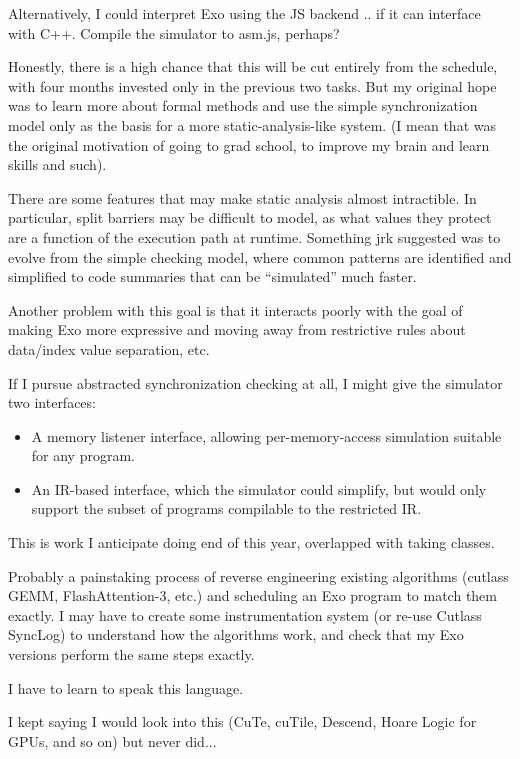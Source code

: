 \filbreak
Alternatively, I could interpret Exo using the JS backend .. if it can interface with C++.
Compile the simulator to asm.js, perhaps?

\filbreak
{}

Honestly, there is a high chance that this will be cut entirely from the schedule, with four months invested only in the previous two tasks.
But my original hope was to learn more about formal methods and use the simple synchronization model only as the basis for a more static-analysis-like system.
(I mean that was the original motivation of going to grad school, to improve my brain and learn skills and such).

\filbreak
There are some features that may make static analysis almost intractible.
In particular, split barriers may be difficult to model, as what values they protect are a function of the execution path at runtime.
Something jrk suggested was to evolve from the simple checking model, where common patterns are identified and simplified to code summaries that can be ``simulated'' much faster.

\filbreak
Another problem with this goal is that it interacts poorly with the goal of making Exo more expressive and moving away from restrictive rules about data/index value separation, etc.

\filbreak
If I pursue abstracted synchronization checking at all, I might give the simulator two interfaces:
\begin{itemize}
  \item A memory listener interface, allowing per-memory-access simulation suitable for any program.
  \item An IR-based interface, which the simulator could simplify, but would only support the subset of programs compilable to the restricted IR.
\end{itemize}

\filbreak
{}

This is work I anticipate doing end of this year, overlapped with taking classes.

 Probably a painstaking process of reverse engineering existing algorithms (cutlass GEMM, FlashAttention-3, etc.) and scheduling an Exo program to match them exactly.
I may have to create some instrumentation system (or re-use Cutlass SyncLog) to understand how the algorithms work, and check that my Exo versions perform the same steps exactly.

 I have to learn to speak this language.

 I kept saying I would look into this (CuTe, cuTile, Descend, Hoare Logic for GPUs, and so on) but never did...

\filbreak
{}


